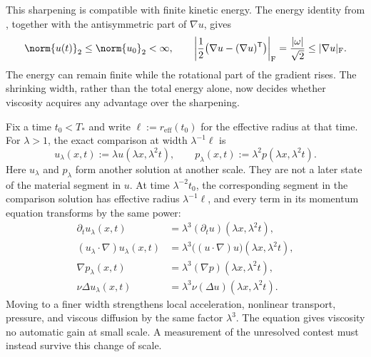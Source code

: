This sharpening is compatible with finite kinetic energy. The energy identity from , together with the antisymmetric part of \(\nabla u\), gives
\[
  \norm{u(t)}_2
  \leq
  \norm{u_0}_2
  <\infty,
  \qquad
  \left|\frac12\bigl(\nabla u-(\nabla u)^{\mathsf T}\bigr)\right|_{\mathrm F}
  =
  \frac{|\omega|}{\sqrt2}
  \leq
  |\nabla u|_{\mathrm F}.
\]
The energy can remain finite while the rotational part of the gradient rises. The shrinking width, rather than the total energy alone, now decides whether viscosity acquires any advantage over the sharpening.


Fix a time \(t_0<T_*\) and write \(\ell:=r_{\mathrm{eff}}(t_0)\) for the effective radius at that time. For \(\lambda>1\), the exact \NavierStokes{} comparison at width \(\lambda^{-1}\ell\) is
\[
  u_\lambda(x,t)
  :=
  \lambda u(\lambda x,\lambda^2t),
  \qquad
  p_\lambda(x,t)
  :=
  \lambda^2p(\lambda x,\lambda^2t).
\]
Here \(u_\lambda\) and \(p_\lambda\) form another solution at another scale. They are not a later state of the material segment in \(u\). At time \(\lambda^{-2}t_0\), the corresponding segment in the comparison solution has effective radius \(\lambda^{-1}\ell\), and every term in its momentum equation transforms by the same power:
\[
\begin{aligned}
  \partial_tu_\lambda(x,t)
  &=
  \lambda^3(\partial_tu)(\lambda x,\lambda^2t),
  \\
  (u_\lambda\cdot\nabla)u_\lambda(x,t)
  &=
  \lambda^3\bigl((u\cdot\nabla)u\bigr)(\lambda x,\lambda^2t),
  \\
  \nabla p_\lambda(x,t)
  &=
  \lambda^3(\nabla p)(\lambda x,\lambda^2t),
  \\
  \nu\Delta u_\lambda(x,t)
  &=
  \lambda^3\nu(\Delta u)(\lambda x,\lambda^2t).
\end{aligned}
\]
Moving to a finer width strengthens local acceleration, nonlinear transport, pressure, and viscous diffusion by the same factor \(\lambda^3\). The equation gives viscosity no automatic gain at small scale. A measurement of the unresolved contest must instead survive this change of scale.


